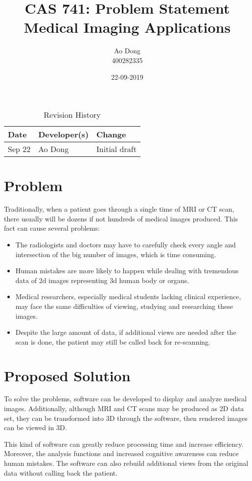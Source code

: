 \documentclass{article}
\title{CAS 741: Problem Statement\\Medical Imaging Applications}
\author{Ao Dong\\400282335}
\date{22-09-2019}
\begin{document}
\maketitle

\begin{table}[hp]
\caption{Revision History} \label{TblRevisionHistory}
\begin{tabularx}{\textwidth}{llX}
\toprule
\textbf{Date} & \textbf{Developer(s)} & \textbf{Change}\\
\midrule
Sep 22 & Ao Dong & Initial draft\\
\bottomrule
\end{tabularx}
\end{table}

\section*{Problem}
Traditionally, when a patient goes through a single time of MRI or CT scan, there usually will be dozens if not hundreds of medical images produced. This fact can cause several problems:

\begin{itemize}
\item The radiologists and doctors may have to carefully check every angle and intersection of the big number of images, which is time consuming.
\item Human mistakes are more likely to happen while dealing with tremendous data of 2d images representing 3d human body or organs.
\item Medical researchers, especially medical students lacking clinical experience, may face the same difficulties of viewing, studying and researching these images.
\item Despite the large amount of data, if additional views are needed after the scan is done, the patient may still be called back for re-scanning.
\end{itemize}

\section*{Proposed Solution}
To solve the problems, software can be developed to display and analyze medical images. Additionally, although MRI and CT scans may be produced as 2D data set, they can be transformed into 3D through the software, then rendered images can be viewed in 3D.

\medskip
This kind of software can greatly reduce processing time and increase efficiency. Moreover, the analysis functions and increased cognitive awareness can reduce human mistakes. The software can also rebuild additional views from the original data without calling back the patient.
\end{document}
